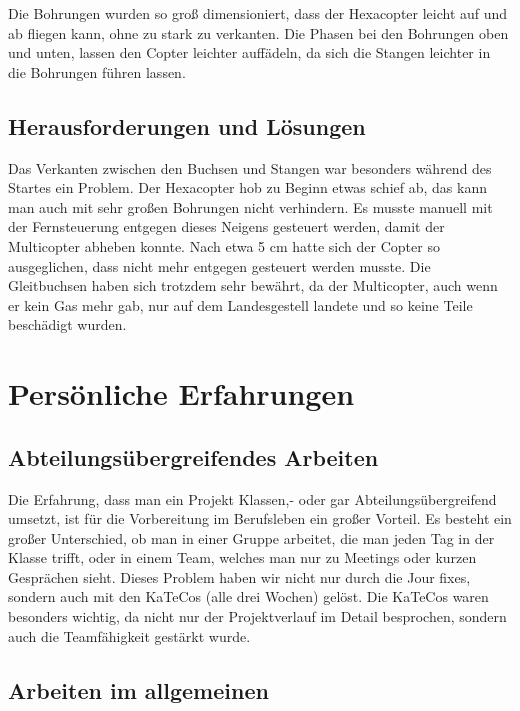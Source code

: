 	Die Bohrungen wurden so groß dimensioniert, dass der Hexacopter leicht auf und ab fliegen kann, ohne zu stark zu verkanten.
	Die Phasen bei den Bohrungen oben und unten, lassen den Copter leichter auffädeln, da sich die Stangen leichter in die Bohrungen führen lassen.

	\subsection{Herausforderungen und Lösungen}

	Das Verkanten zwischen den Buchsen und Stangen war besonders während des Startes ein Problem.
	Der Hexacopter hob zu Beginn etwas  schief ab, das kann man auch mit sehr großen Bohrungen nicht verhindern.
	Es musste manuell mit der Fernsteuerung entgegen dieses Neigens gesteuert werden, damit der Multicopter abheben konnte.
	Nach etwa 5 cm hatte sich der Copter so ausgeglichen, dass nicht mehr entgegen gesteuert werden musste.
	Die Gleitbuchsen haben sich trotzdem sehr bewährt, da der Multicopter, auch wenn er kein Gas mehr gab, nur auf dem Landesgestell landete und so keine Teile beschädigt wurden.

			\newpage

\section{Persönliche Erfahrungen}

	\subsection{Abteilungsübergreifendes Arbeiten}

	Die Erfahrung, dass man ein Projekt Klassen,- oder gar Abteilungsübergreifend umsetzt, ist für die Vorbereitung im Berufsleben ein großer Vorteil.
	Es besteht ein großer Unterschied, ob man in einer Gruppe arbeitet, die man jeden Tag in der Klasse trifft, oder in einem Team, welches man nur zu Meetings oder kurzen Gesprächen sieht.
	Dieses Problem haben wir nicht nur durch die Jour fixes, sondern auch mit den KaTeCos (alle drei Wochen) gelöst.
	Die KaTeCos waren besonders wichtig, da nicht nur der Projektverlauf im Detail besprochen, sondern auch die Teamfähigkeit gestärkt wurde.

	\subsection{Arbeiten im allgemeinen}

